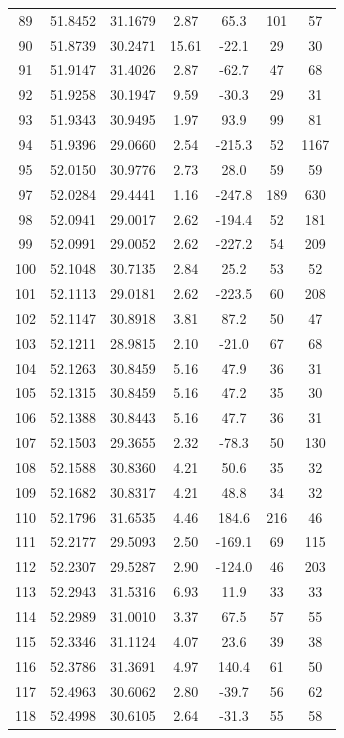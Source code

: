 \begin{longtable}{ccccccc}
89 & 51.8452 & 31.1679 & 2.87 & 65.3 & 101 & 57 \\
90 & 51.8739 & 30.2471 & 15.61 & -22.1 & 29 & 30 \\
91 & 51.9147 & 31.4026 & 2.87 & -62.7 & 47 & 68 \\
92 & 51.9258 & 30.1947 & 9.59 & -30.3 & 29 & 31 \\
93 & 51.9343 & 30.9495 & 1.97 & 93.9 & 99 & 81 \\
94 & 51.9396 & 29.0660 & 2.54 & -215.3 & 52 & 1167 \\
95 & 52.0150 & 30.9776 & 2.73 & 28.0 & 59 & 59 \\
97 & 52.0284 & 29.4441 & 1.16 & -247.8 & 189 & 630 \\
98 & 52.0941 & 29.0017 & 2.62 & -194.4 & 52 & 181 \\
99 & 52.0991 & 29.0052 & 2.62 & -227.2 & 54 & 209 \\
100 & 52.1048 & 30.7135 & 2.84 & 25.2 & 53 & 52 \\
101 & 52.1113 & 29.0181 & 2.62 & -223.5 & 60 & 208 \\
102 & 52.1147 & 30.8918 & 3.81 & 87.2 & 50 & 47 \\
103 & 52.1211 & 28.9815 & 2.10 & -21.0 & 67 & 68 \\
104 & 52.1263 & 30.8459 & 5.16 & 47.9 & 36 & 31 \\
105 & 52.1315 & 30.8459 & 5.16 & 47.2 & 35 & 30 \\
106 & 52.1388 & 30.8443 & 5.16 & 47.7 & 36 & 31 \\
107 & 52.1503 & 29.3655 & 2.32 & -78.3 & 50 & 130 \\
108 & 52.1588 & 30.8360 & 4.21 & 50.6 & 35 & 32 \\
109 & 52.1682 & 30.8317 & 4.21 & 48.8 & 34 & 32 \\
110 & 52.1796 & 31.6535 & 4.46 & 184.6 & 216 & 46 \\
111 & 52.2177 & 29.5093 & 2.50 & -169.1 & 69 & 115 \\
112 & 52.2307 & 29.5287 & 2.90 & -124.0 & 46 & 203 \\
113 & 52.2943 & 31.5316 & 6.93 & 11.9 & 33 & 33 \\
114 & 52.2989 & 31.0010 & 3.37 & 67.5 & 57 & 55 \\
115 & 52.3346 & 31.1124 & 4.07 & 23.6 & 39 & 38 \\
116 & 52.3786 & 31.3691 & 4.97 & 140.4 & 61 & 50 \\
117 & 52.4963 & 30.6062 & 2.80 & -39.7 & 56 & 62 \\
118 & 52.4998 & 30.6105 & 2.64 & -31.3 & 55 & 58 \\

\end{longtable}
